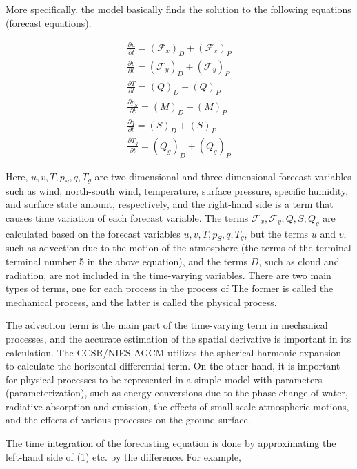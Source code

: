 More specifically, the model basically finds the solution to the
following equations (forecast equations).

\begin{eqnarray}
  \frac{\partial{u}}{\partial {t}}  =  \left( {\mathcal F}_x \right)_D + \left( {\mathcal F}_x \right)_P
   \\
  \frac{\partial{v}}{\partial {t}}  =  \left( {\mathcal F}_y \right)_D + \left( {\mathcal F}_y \right)_P \\
  \frac{\partial{T}}{\partial {t}}  =  \left( Q \right)_D + \left( Q \right)_P \\
  \frac{\partial{p_S}}{\partial {t}}  =  \left( M \right)_D + \left( M \right)_P \\
  \frac{\partial{q}}{\partial {t}}  =  \left( S \right)_D + \left( S \right)_P \\
  \frac{\partial{T_g}}{\partial {t}}  =  \left( Q_g \right)_D + \left( Q_g \right)_P
\end{eqnarray}

Here, \(u,v,T,p_S,q,T_g\) are two-dimensional and three-dimensional
forecast variables such as wind, north-south wind, temperature, surface
pressure, specific humidity, and surface state amount, respectively, and
the right-hand side is a term that causes time variation of each
forecast variable. The terms \({\mathcal F}_x,{\mathcal F}_y,Q,S,Q_g\)
are calculated based on the forecast variables \(u,v,T,p_S,q,T_g\), but
the terms \(u\) and \(v\), such as advection due to the motion of the
atmosphere (the terms of the terminal terminal number 5 in the above
equation), and the terms \(D\), such as cloud and radiation, are not
included in the time-varying variables. There are two main types of
terms, one for each process in the process of The former is called the
mechanical process, and the latter is called the physical process.

The advection term is the main part of the time-varying term in
mechanical processes, and the accurate estimation of the spatial
derivative is important in its calculation. The CCSR/NIES AGCM utilizes
the spherical harmonic expansion to calculate the horizontal
differential term. On the other hand, it is important for physical
processes to be represented in a simple model with parameters
(parameterization), such as energy conversions due to the phase change
of water, radiative absorption and emission, the effects of small-scale
atmospheric motions, and the effects of various processes on the ground
surface.

The time integration of the forecasting equation is done by
approximating the left-hand side of (1) etc. by the difference. For
example,

